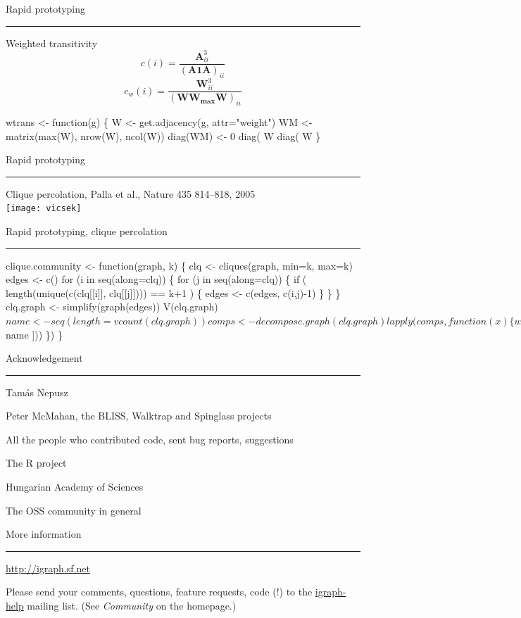 \documentclass[landscape,fleqno]{foils}
\newcommand{\stitle}[1]{{\color{blue}\Large #1\par\vspace*{10pt}\hrule}}
\newcommand{\cstitle}[1]{{\centering\color{blue}\Large #1\par\vspace*{10pt}\hrule}}
\newenvironment{narrow}[2]{%
  \begin{list}{}{%
      \setlength{\topsep}{0pt}%
      \setlength{\leftmargin}{#1}%
      \setlength{\rightmargin}{#2}%
      \setlength{\listparindent}{\parindent}%
      \setlength{\itemindent}{\parindent}%
      \setlength{\parsep}{\parskip}}%
    \item[]}{\end{list}}
\begin{document}
\newpage
\stitle{Rapid prototyping}
\begin{narrow}{0cm}{15cm}
Weighted transitivity
\[ c(i)=\frac{\mathbf{A}^3_{ii}}{(\mathbf{A1A})_{ii}} \] \pause
\[ c_w(i)=\frac{\mathbf{W}^3_{ii}}{(\mathbf{WW_{\text{max}}W})_{ii}} \] \pause
\begin{Myverb}
  wtrans <- function(g) \{
    W <- get.adjacency(g, attr="weight")
    WM <- matrix(max(W), nrow(W), ncol(W))
    diag(WM) <- 0
    diag( W %
       diag( W %
  \}
\end{Myverb}
\end{narrow}

\newpage
\stitle{Rapid prototyping}
\begin{narrow}{0cm}{15cm}
Clique percolation, 
Palla et al., Nature 435 814--818, 2005\\
\texttt{[image: vicsek]}
\end{narrow}

\newpage
\stitle{Rapid prototyping, clique percolation}
\begin{narrow}{0cm}{15cm}
\vspace*{-10pt}
\begin{Myverb}
  clique.community <- function(graph, k) \{
   clq <- cliques(graph, min=k, max=k)
   edges <- c()
   for (i in seq(along=clq)) \{
     for (j in seq(along=clq)) \{
       if ( length(unique(c(clq[[i]], 
             clq[[j]]))) == k+1 ) \{
         edges <- c(edges, c(i,j)-1)
       \}
     \}
   \}
   clq.graph <- simplify(graph(edges))
   V(clq.graph)$name <- 
      seq(length=vcount(clq.graph))
   comps <- decompose.graph(clq.graph)
   
   lapply(comps, function(x) \{
     unique(unlist(clq[ V(x)$name ]))
   \})
  \}
\end{Myverb}
\end{narrow}

\newpage
\cstitle{Acknowledgement}

\begin{center}
\vfill
Tam\'as Nepusz\par\vfil
Peter McMahan, the BLISS, Walktrap and Spinglass projects\par\vfil
All the people who contributed code, sent bug reports, suggestions\par\vfil
The R project\par\vfil
Hungarian Academy of Sciences\par\vfil
The OSS community in general\par\vfill
\end{center}

\newpage
\cstitle{More information}
\begin{center}
\vfill
\centerline{\LARGE\url{http://igraph.sf.net}}\par\vspace*{3cm}
Please send your comments, questions, feature requests, code (!) to the
\url{igraph-help} mailing list. (See \textit{Community} on the
homepage.)\par\vfill
\end{center}
\end{document}
